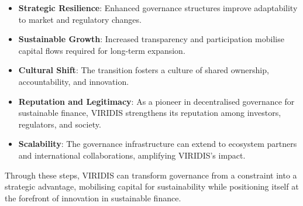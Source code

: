 \documentclass[
  english,
  12pt,
  oneside,
  open=any]{scrbook}
\providecommand{\tightlist}{%
  \setlength{\itemsep}{0pt}\setlength{\parskip}{0pt}}\usepackage{longtable,booktabs,array}
\begin{document}
\begin{itemize}
\tightlist
\item
  \textbf{Strategic Resilience}: Enhanced governance structures improve
  adaptability to market and regulatory changes.\\
\item
  \textbf{Sustainable Growth}: Increased transparency and participation
  mobilise capital flows required for long-term expansion.\\
\item
  \textbf{Cultural Shift}: The transition fosters a culture of shared
  ownership, accountability, and innovation.\\
\item
  \textbf{Reputation and Legitimacy}: As a pioneer in decentralised
  governance for sustainable finance, VIRIDIS strengthens its reputation
  among investors, regulators, and society.\\
\item
  \textbf{Scalability}: The governance infrastructure can extend to
  ecosystem partners and international collaborations, amplifying
  VIRIDIS's impact.
\end{itemize}

Through these steps, VIRIDIS can transform governance from a constraint
into a strategic advantage, mobilising capital for sustainability while
positioning itself at the forefront of innovation in sustainable
finance.
\end{document}

